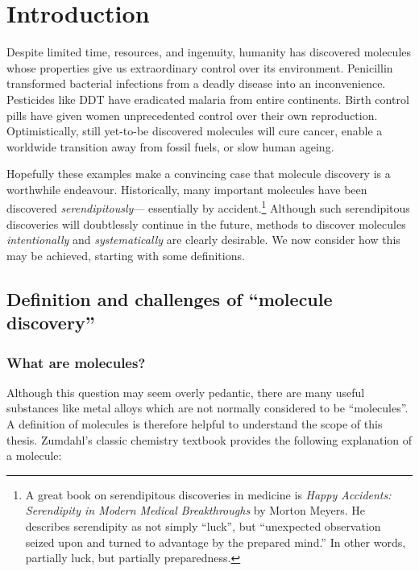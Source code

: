 
\chapter{Introduction}
\label{chapter:intro}

\ifpdf
    \graphicspath{{chapter01-intro/figures}}
\else
    \graphicspath{}
\fi

Despite limited time, resources, and ingenuity, humanity has discovered molecules
whose properties give us extraordinary control over its environment.
Penicillin transformed bacterial infections from a deadly disease into an inconvenience.
Pesticides like DDT have eradicated malaria from entire continents.
Birth control pills have given women unprecedented control over their own reproduction.
Optimistically, still yet-to-be discovered molecules will cure cancer,
enable a worldwide transition away from fossil fuels,
or slow human ageing.

Hopefully these examples make a convincing case
that molecule discovery is a worthwhile endeavour.
Historically, many important molecules have been discovered
\emph{serendipitously}---
essentially by accident.\footnote{
    A great book on serendipitous discoveries in medicine is
    \emph{Happy Accidents: Serendipity in Modern Medical Breakthroughs}
    by Morton Meyers.
    He describes serendipity as not simply ``luck'',
    but ``unexpected observation seized upon and turned to advantage by the prepared mind.''
    In other words, partially luck, but partially preparedness.
}
Although such serendipitous discoveries will doubtlessly continue in the future,
methods to discover molecules \emph{intentionally} and \emph{systematically} are clearly desirable.
We now consider how this may be achieved, starting with some definitions.

\section{Definition and challenges of ``molecule discovery''}

\subsection{What are molecules?}
\label{sec:what are molecules}

Although this question may seem overly pedantic,
there are many useful substances like metal alloys which
are not normally considered to be ``molecules''.
A definition of molecules is therefore helpful to understand the scope of this thesis.
Zumdahl's classic chemistry textbook \citep[page 52]{zumdahl2006chemistry}
provides the following explanation of a molecule:

